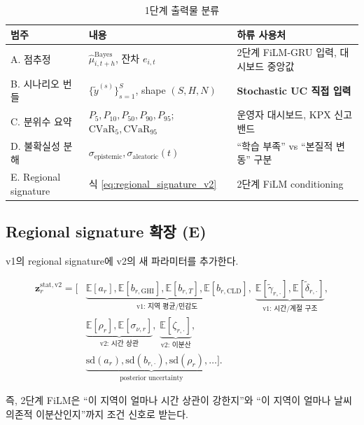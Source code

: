 \documentclass[11pt,a4paper]{article}
\begin{document}
\begin{table}[H]
\centering
\small
\caption{1단계 출력물 분류}
\begin{tabular}{p{2.5cm}p{4.5cm}p{7cm}}
\toprule
범주 & 내용 & 하류 사용처 \\
\midrule
A. 점추정 & $\hat\mu^{\mathrm{Bayes}}_{i,t+h}$, 잔차 $e_{i,t}$ & 2단계 FiLM-GRU 입력, 대시보드 중앙값 \\
B. 시나리오 번들 & $\{\tilde y^{(s)}\}_{s=1}^{S}$, shape $(S,H,N)$ & \textbf{Stochastic UC 직접 입력} \\
C. 분위수 요약 & $P_5, P_{10}, P_{50}, P_{90}, P_{95}$; $\mathrm{CVaR}_5, \mathrm{CVaR}_{95}$ & 운영자 대시보드, KPX 신고 밴드 \\
D. 불확실성 분해 & $\sigma_{\mathrm{epistemic}}, \sigma_{\mathrm{aleatoric}}(t)$ & ``학습 부족'' vs ``본질적 변동'' 구분 \\
E. Regional signature & 식 \eqref{eq:regional_signature_v2} & 2단계 FiLM conditioning \\
\bottomrule
\end{tabular}
\end{table}

\subsection{Regional signature 확장 (E)}

v1의 regional signature에 v2의 새 파라미터를 추가한다.

\begin{align}
    \bm z_r^{\mathrm{stat,v2}} = \Big[&
    \underbrace{\mathbb{E}[a_r],\mathbb{E}[b_{r,\mathrm{GHI}}],\mathbb{E}[b_{r,T}],\mathbb{E}[b_{r,\mathrm{CLD}}]}_{\text{v1: 지역 평균/민감도}},\;
    \underbrace{\mathbb{E}[\tilde\gamma_{r,\cdot}],\mathbb{E}[\tilde\delta_{r,\cdot}]}_{\text{v1: 시간/계절 구조}}, \nonumber\\
    &\underbrace{\mathbb{E}[\rho_r],\mathbb{E}[\sigma_{\nu,r}]}_{\text{v2: 시간 상관}},\;
    \underbrace{\mathbb{E}[\zeta_{r,\cdot}]}_{\text{v2: 이분산}}, \nonumber\\
    &\underbrace{\mathrm{sd}(a_r),\mathrm{sd}(b_{r,\cdot}),\mathrm{sd}(\rho_r),\dots}_{\text{posterior uncertainty}}
    \Big].
    \label{eq:regional_signature_v2}
\end{align}

즉, 2단계 FiLM은 ``이 지역이 얼마나 시간 상관이 강한지''와 ``이 지역이 얼마나 날씨 의존적 이분산인지''까지 조건 신호로 받는다.

\end{document}
